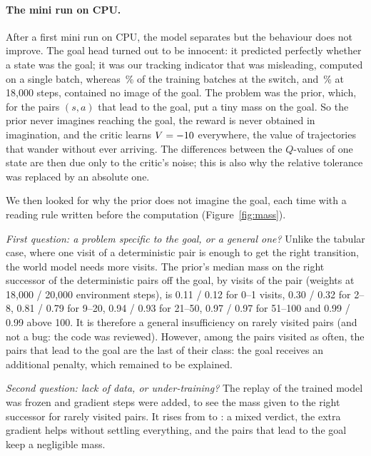 \documentclass[10pt]{article}
\begin{document}
\paragraph{The mini run on CPU.}
After a first mini run on CPU, the model separates but the behaviour does not improve.
The goal head turned out to be innocent: it predicted perfectly whether a state was the goal; it was our tracking
indicator that was misleading, computed on a single batch, whereas \eThreeMiniNoGoalAtSwitch\,\% of the training batches
at the switch, and \eThreeMiniNoGoalAtResume\,\% at 18,000 steps, contained no image of the goal. %
The problem was the prior, which, for the pairs $(s, a)$ that lead to the goal, put a tiny mass on the goal.
So the prior never imagines reaching the goal, the reward is never obtained in imagination, and the critic learns
$V = -10$ everywhere, the value of trajectories that wander without ever arriving.
The differences between the $Q$-values of one state are then due only to the critic's noise; this is also why the
relative tolerance was replaced by an absolute one.

We then looked for why the prior does not imagine the goal, each time with a reading rule written before the
computation (Figure~\ref{fig:mass}).

\emph{First question: a problem specific to the goal, or a general one?}
Unlike the tabular case, where one visit of a deterministic pair is enough to get the right transition, the world model
needs more visits.
The prior's median mass on the right successor of the deterministic pairs off the goal, by visits of the pair (weights at
18,000 / 20,000 environment steps), is 0.11 / 0.12 for 0--1 visits, 0.30 / 0.32 for 2--8, 0.81 / 0.79 for 9--20, %
0.94 / 0.93 for 21--50, 0.97 / 0.97 for 51--100 and 0.99 / 0.99 above 100. %
It is therefore a general insufficiency on rarely visited pairs (and not a bug: the code was reviewed).
However, among the pairs visited as often, the pairs that lead to the goal are the last of their class: the goal
receives an additional penalty, which remained to be explained.

\emph{Second question: lack of data, or under-training?}
The replay of the trained model was frozen and \eThreeMiniExtraGradSteps{} gradient steps were added, to see the mass
given to the right successor for rarely visited pairs.
It rises from \eThreeMiniMassStart{} to \eThreeMiniMassEnd: a mixed verdict, the extra gradient helps without settling
everything, and the pairs that lead to the goal keep a negligible mass.
\end{document}
